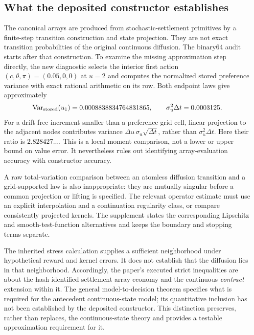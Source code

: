 \subsection{What the deposited constructor establishes}
The canonical arrays are produced from stochastic-settlement primitives by a finite-step transition construction and state projection. They are not exact transition probabilities of the original continuous diffusion. The binary64 audit starts after that construction. To examine the missing approximation step directly, the new diagnostic selects the interior first action $(c,\theta,\pi)=(0.05,0,0)$ at $u=2$ and computes the normalized stored preference variance with exact rational arithmetic on its row. Both endpoint laws give approximately
\begin{equation}
 \operatorname{Var}_{\rm stored}(u_1)=0.0008838834764831865,
 \qquad \sigma_u^2\Delta t=0.0003125.
 \label{eq:variance}
\end{equation}
For a drift-free increment smaller than a preference grid cell, linear projection to the adjacent nodes contributes variance $\Delta u\,\sigma_u\sqrt{\Delta t}$, rather than $\sigma_u^2\Delta t$. Here their ratio is $2.828427\ldots$. This is a local moment comparison, not a lower or upper bound on value error. It nevertheless rules out identifying array-evaluation accuracy with constructor accuracy.

A raw total-variation comparison between an atomless diffusion transition and a grid-supported law is also inappropriate: they are mutually singular before a common projection or lifting is specified. The relevant operator estimate must use an explicit interpolation and a continuation regularity class, or compare consistently projected kernels. The supplement states the corresponding Lipschitz and smooth-test-function alternatives and keeps the boundary and stopping terms separate.

The inherited stress calculation supplies a sufficient neighborhood under hypothetical reward and kernel errors. It does not establish that the diffusion lies in that neighborhood. Accordingly, the paper's executed strict inequalities are about the hash-identified settlement array economy and the continuous \emph{contract} extension within it. The general model-to-decision theorem specifies what is required for the antecedent continuous-state model; its quantitative inclusion has not been established by the deposited constructor. This distinction preserves, rather than replaces, the continuous-state theory and provides a testable approximation requirement for it.

